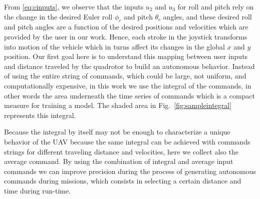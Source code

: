 \documentclass[letterpaper, 10 pt, conference]{ieeeconf}  %
\newcommand\NB[1]{$\spadesuit$\footnote{NB: #1}}
\begin{document}
From \eqref{eq:cinputs}, we observe that the inputs $u_2$ and $u_3$ for roll and pitch rely on the change in the desired Euler roll $\phi_c$ and pitch $\theta_c$ angles, and these desired roll and pitch angles are a function of the desired positions and velocities which are provided by the user in our work. 
Hence, each stroke in the joystick transforms into motion of the vehicle which in turns affect its changes in the global $x$ and $y$ position. Our first goal here is to understand this mapping between user inputs and distance traveled by the quadrotor to build an autonomous behavior. Instead of using the entire string of commands, which could be large, not uniform, and computationally expensive, in this work we use the integral of the commands, in other words the area underneath the time series of commands which is a compact measure for training a model. The shaded area in Fig.~\ref{fig:sampleintegral} represents this integral. 



Because the integral by itself may not be enough to characterize a unique behavior of the UAV because the same integral can be achieved with commands strings for different traveling distance and velocities, here we collect also the average command. By using the combination of integral and average input commands we can improve precision during the process of generating autonomous commands during missions, which consists in selecting a certain distance and time during run-time.
\end{document}
